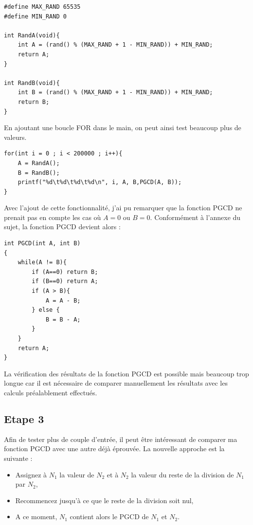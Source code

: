 \documentclass[a4paper]{article}
\begin{document}
\begin{lstlisting}[style=CStyle]
#define MAX_RAND 65535
#define MIN_RAND 0 

int RandA(void){
	int A = (rand() % (MAX_RAND + 1 - MIN_RAND)) + MIN_RAND;
    return A;
}

int RandB(void){
	int B = (rand() % (MAX_RAND + 1 - MIN_RAND)) + MIN_RAND;
    return B;
}
\end{lstlisting}
        En ajoutant une boucle FOR dans le main, on peut ainsi test beaucoup plus de valeurs.
\begin{lstlisting}[style=CStyle]
for(int i = 0 ; i < 200000 ; i++){
	A = RandA();
	B = RandB();
	printf("%d\t%d\t%d\t%d\n", i, A, B,PGCD(A, B));
}
\end{lstlisting}
        
        \newpage
        Avec l'ajout de cette fonctionnalité, j'ai pu remarquer que la fonction PGCD ne prenait pas en compte les cas où $A = 0$ ou $B = 0$.
        Conformément à l'annexe du sujet, la fonction PGCD devient alors :
\begin{lstlisting}[style=CStyle]
int PGCD(int A, int B)
{
	while(A != B){
		if (A==0) return B; 
		if (B==0) return A;
		if (A > B){
			A = A - B;
		} else {
			B = B - A;
		}
	}
	return A;
}
\end{lstlisting}
        La vérification des résultats de la fonction PGCD est possible mais beaucoup trop longue car 
        il est nécessaire de comparer manuellement les résultats avec les calculs préalablement effectués.
    
    \subsection{Etape 3}
        Afin de tester plus de couple d'entrée, il peut être intéressant de comparer ma fonction PGCD avec une autre déjà éprouvée.
        La nouvelle approche est la suivante :
        \begin{itemize}
            \item Assignez à $N_1$ la valeur de $N_2$ et à $N_2$ la valeur du reste de la division de $N_1$ par $N_2$,
            \item Recommencez jusqu'à ce que le reste de la division soit nul,
            \item A ce moment, $N_1$ contient alors le PGCD de $N_1$ et $N_2$.
        \end{itemize}
        
\end{document}
